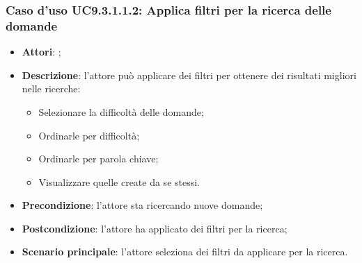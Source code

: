 		 \subsubsection{Caso d'uso UC9.3.1.1.2: Applica filtri per la ricerca delle domande}
		 \label{UC9.3.1.1.2}
		 \begin{itemize}
		 	\item \textbf{Attori}: \uaupro{};
		 	\item \textbf{Descrizione}: l'attore può applicare dei filtri per ottenere dei risultati migliori nelle ricerche: 
			 	\begin{itemize}
					\item Selezionare la difficoltà delle domande;
					\item Ordinarle per difficoltà;
					\item Ordinarle per parola chiave;
					\item Visualizzare quelle create da se stessi.
			 	\end{itemize}
		 	\item \textbf{Precondizione}: l'attore sta ricercando nuove domande;
		 	\item \textbf{Postcondizione}: l'attore ha applicato dei filtri per la ricerca; 
		 	\item \textbf{Scenario principale}: l'attore seleziona dei filtri da applicare per la ricerca.
		 \end{itemize}
		 
